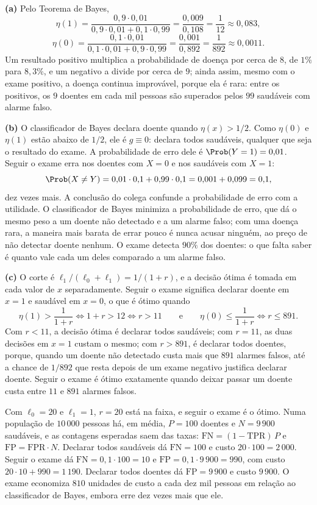 \begin{solucao}
\textbf{(a)} Pelo Teorema de Bayes,
\[
  \eta(1)=\frac{0{,}9\cdot0{,}01}{0{,}9\cdot0{,}01+0{,}1\cdot0{,}99}
        =\frac{0{,}009}{0{,}108}=\frac1{12}\approx0{,}083,
\]
\[
  \eta(0)=\frac{0{,}1\cdot0{,}01}{0{,}1\cdot0{,}01+0{,}9\cdot0{,}99}
        =\frac{0{,}001}{0{,}892}=\frac1{892}\approx0{,}0011 .
\]
Um resultado positivo multiplica a probabilidade de doença por cerca de $8$, de $1\%$ para
$8{,}3\%$, e um negativo a divide por cerca de $9$; ainda assim, mesmo com o exame positivo,
a doença continua improvável, porque ela é rara: entre os positivos, os $9$ doentes em cada
mil pessoas são superados pelos $99$ saudáveis com alarme falso.

\smallskip
\textbf{(b)} O classificador de Bayes declara doente quando $\eta(x)>1/2$. Como
$\eta(0)$ e $\eta(1)$ estão abaixo de $1/2$, ele é $g\equiv0$: declara todos saudáveis,
qualquer que seja o resultado do exame. A probabilidade de erro dele é
$\Prob(Y=1)=0{,}01$. Seguir o exame erra nos doentes com $X=0$ e nos saudáveis com $X=1$:
\[
  \Prob(X\ne Y)=0{,}01\cdot0{,}1+0{,}99\cdot0{,}1=0{,}001+0{,}099=0{,}1 ,
\]
dez vezes mais. A conclusão do colega confunde a probabilidade de erro com a utilidade. O
classificador de Bayes minimiza a probabilidade de erro, que dá o mesmo peso a um doente não
detectado e a um alarme falso; com uma doença rara, a maneira mais barata de errar pouco é
nunca acusar ninguém, ao preço de não detectar doente nenhum. O exame detecta $90\%$ dos
doentes: o que falta saber é quanto vale cada um deles comparado a um alarme falso.

\smallskip
\textbf{(c)} O corte é $\ell_1/(\ell_0+\ell_1)=1/(1+r)$, e a decisão ótima é tomada em cada
valor de $x$ separadamente. Seguir o exame significa declarar doente em $x=1$ e saudável em
$x=0$, o que é ótimo quando
\[
  \eta(1)>\frac1{1+r}\iff1+r>12\iff r>11
  \qquad\text{e}\qquad
  \eta(0)\le\frac1{1+r}\iff r\le891 .
\]
Com $r<11$, a decisão ótima é declarar todos saudáveis; com $r=11$, as duas decisões em
$x=1$ custam o mesmo; com $r>891$, é declarar todos doentes, porque, quando um doente não
detectado custa mais que $891$ alarmes falsos, até a chance de $1/892$ que resta depois de
um exame negativo justifica declarar doente. Seguir o exame é ótimo exatamente quando deixar
passar um doente custa entre $11$ e $891$ alarmes falsos.

Com $\ell_0=20$ e $\ell_1=1$, $r=20$ está na faixa, e seguir o exame é o ótimo. Numa
população de $10\,000$ pessoas há, em média, $P=100$ doentes e $N=9\,900$ saudáveis, e as
contagens esperadas saem das taxas: $\mathrm{FN}=(1-\mathrm{TPR})\,P$ e
$\mathrm{FP}=\mathrm{FPR}\cdot N$. Declarar todos saudáveis dá $\mathrm{FN}=100$ e custo
$20\cdot100=2\,000$. Seguir o exame dá $\mathrm{FN}=0{,}1\cdot100=10$ e
$\mathrm{FP}=0{,}1\cdot9\,900=990$, com custo $20\cdot10+990=1\,190$. Declarar todos doentes dá
$\mathrm{FP}=9\,900$ e custo $9\,900$. O exame economiza $810$ unidades de custo a cada dez mil
pessoas em relação ao classificador de Bayes, embora erre dez vezes mais que ele.


\end{solucao}
